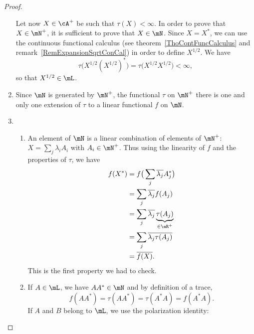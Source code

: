 \begin{proof}
\begin{enumerate}
            Let now $X\in\cA^+$ be such that $\tau(X)<\infty$. In order to prove that $X\in\mN^+$, it is sufficient to prove that $X\in\mN$. Since $X=X^*$, we can use the continuous functional calculus (see theorem~\ref{ThoContFuncCalculus} and remark~\ref{RemExpansionSqrtConCal}) in order to define $X^{1/2}$. We have
            \begin{equation}
                \tau\big( X^{1/2}(X^{1/2})^* \big)=\tau\big( X^{1/2}X^{1/2} \big)<\infty,
            \end{equation}
            so that $X^{1/2}\in\mL$.
        \item
            Since $\mN$ is generated by $\mN^{+}$, the functional $\tau$ on $\mN^+$ there is one and only one extension of $\tau$ to a linear functional $f$ on $\mN$.
        \item
            \begin{enumerate}
                \item
                    An element of $\mN$ is a linear combination of elements of $\mN^+$: $X=\sum_j\lambda_iA_i$ with $A_i\in\mN^+$. Thus using the linearity of $f$ and the properties of $\tau$, we have
                    \begin{equation}
                        \begin{aligned}[]
                            f(X^*)&=f\big( \sum_j\overline{ \lambda_j }A_j^* \big)\\
                            &=\sum_j\overline{ \lambda_j }f(A_j)\\
                            &=\sum_j\overline{ \lambda_j }\underbrace{\tau(A_j)}_{\in\eR^{+}}\\
                            &=\sum_j\overline{ \lambda_j \tau(A_j)}\\
                            &=\overline{ f(X) }.
                        \end{aligned}
                    \end{equation}
                    This is the first property we had to check.
                \item
                    If $A\in\mL$, we have $AA^*\in\mN$ and by definition of a trace,
                    \begin{equation}
                        f(AA^*)=\tau(AA^*)=\tau(A^*A)=f(A^*A).
                    \end{equation}
                    If $A$ and $B$ belong to $\mL$, we use the polarization identity:
                    \begin{equation}

\end{equation}
\end{enumerate}
\end{enumerate}
\end{proof}
